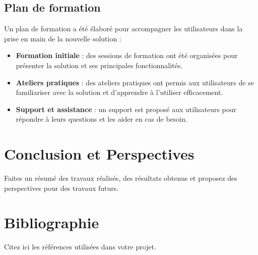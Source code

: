 \documentclass[12pt,a4paper]{report}
\begin{document}
\section{Plan de formation}
Un plan de formation a été élaboré pour accompagner les utilisateurs dans la prise en main de la nouvelle solution :
\begin{itemize}
    \item \textbf{Formation initiale} : des sessions de formation ont été organisées pour présenter la solution et ses principales fonctionnalités.
    \item \textbf{Ateliers pratiques} : des ateliers pratiques ont permis aux utilisateurs de se familiariser avec la solution et d'apprendre à l'utiliser efficacement.
    \item \textbf{Support et assistance} : un support est proposé aux utilisateurs pour répondre à leurs questions et les aider en cas de besoin.
\end{itemize}

\chapter{Conclusion et Perspectives}
\label{chap:conclusion}
Faites un résumé des travaux réalisés, des résultats obtenus et proposez des perspectives pour des travaux futurs.

\chapter*{Bibliographie}
Citez ici les références utilisées dans votre projet.
\end{document}
